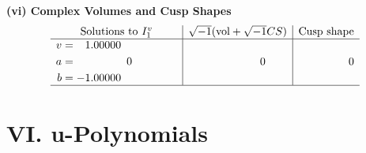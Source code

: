 \documentclass[1p]{elsarticle_modified}
\theoremstyle{definition}
\newcommand{\I}{\sqrt{-1}}
\begin{document}
\newpage\flushleft \textbf{(vi) Complex Volumes and Cusp Shapes}
$$\begin{array}{c|c|c}  
\text{Solutions to }I^v_{1}& \I (\text{vol} + \sqrt{-1}CS) & \text{Cusp shape}\\
 \hline 
\begin{aligned}
v &= \phantom{-}1.00000\phantom{ +0.000000I} \\
a &= \phantom{-0.000000 } 0 \\
b &= -1.00000\phantom{ +0.000000I}\end{aligned}
 & \phantom{-0.000000 } 0 & \phantom{-0.000000 } 0\\
 \hline 
 \end{array}$$\newpage
\newpage\renewcommand{\arraystretch}{1}
\centering \section*{ VI. u-Polynomials}
\end{document}
